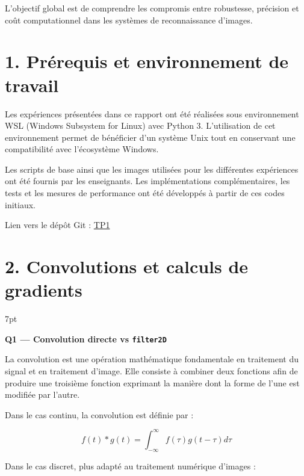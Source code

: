 \documentclass[11pt,a4paper]{article}
\newenvironment{formal}{%
	\def\FrameCommand{%
		\hspace{1pt}%
		{\color{enstaBleuFonce}\vrule width 2pt}%
		{\color{formalshade}\vrule width 4pt}%
		\colorbox{formalshade}%
	}%
	\MakeFramed{\advance\hsize-\width\FrameRestore}%
	\noindent\hspace{-4.55pt}%
	\begin{adjustwidth}{}{7pt}%
		\vspace{2pt}\vspace{2pt}%
	}
	{%
		\vspace{6pt}\end{adjustwidth}\endMakeFramed%
}
\begin{document}
	L’objectif global est de comprendre les compromis entre robustesse, précision et coût computationnel dans les systèmes de reconnaissance d’images.
	
	
	
	\section*{1. Prérequis et environnement de travail}
	
	Les expériences présentées dans ce rapport ont été réalisées sous environnement WSL (Windows Subsystem for Linux) avec Python 3. L’utilisation de cet environnement permet de bénéficier d’un système Unix tout en conservant une compatibilité avec l’écosystème Windows.
	
	Les scripts de base ainsi que les images utilisées pour les différentes expériences ont été fournis par les enseignants. Les implémentations complémentaires, les tests et les mesures de performance ont été développés à partir de ces codes initiaux.
	
	Lien vers le dépôt Git : \href{https://github.com/quietbrelax/Reconaissance}{TP1}
	
	
	\section*{2. Convolutions et calculs de gradients}
	
	\begin{formal}
		\textbf{Q1 — Convolution directe vs \texttt{filter2D}}
	\end{formal}
	
	La convolution est une opération mathématique fondamentale en traitement du signal et en traitement d’image. Elle consiste à combiner deux fonctions afin de produire une troisième fonction exprimant la manière dont la forme de l’une est modifiée par l’autre.
	
	Dans le cas continu, la convolution est définie par :
	
	$$
	f(t)*g(t) = \int_{-\infty}^{\infty} f(\tau) g(t-\tau) d\tau
	$$
	
	Dans le cas discret, plus adapté au traitement numérique d’images :
	
\end{document}
